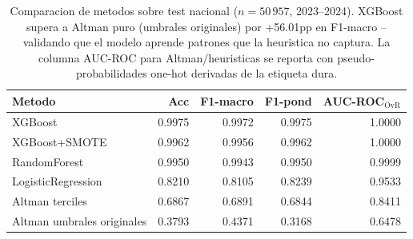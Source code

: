 \begin{table}[ht]
\centering
\small
\caption{Comparacion de metodos sobre test nacional ($n=50\,957$, 2023--2024). XGBoost supera a Altman puro (umbrales originales) por +56.01pp en F1-macro -- validando que el modelo aprende patrones que la heuristica no captura. La columna AUC-ROC para Altman/heuristicas se reporta con pseudo-probabilidades one-hot derivadas de la etiqueta dura.}
\label{tab:comparacion_metodos}
\begin{tabular}{l rrrr}
\toprule
Metodo & Acc & F1-macro & F1-pond & AUC-ROC$_{\text{OvR}}$ \\
\midrule
XGBoost & 0.9975 & 0.9972 & 0.9975 & 1.0000 \\
XGBoost+SMOTE & 0.9962 & 0.9956 & 0.9962 & 1.0000 \\
RandomForest & 0.9950 & 0.9943 & 0.9950 & 0.9999 \\
LogisticRegression & 0.8210 & 0.8105 & 0.8239 & 0.9533 \\
Altman terciles & 0.6867 & 0.6891 & 0.6844 & 0.8411 \\
Altman umbrales originales & 0.3793 & 0.4371 & 0.3168 & 0.6478 \\
\bottomrule
\end{tabular}
\end{table}
